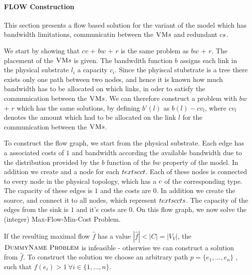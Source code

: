 




\paragraph{FLOW Construction}

This section presents a flow based solution for the variant of the model which 
has bandwidth limitations, communicatin between the $\textsc{VM} s$ and redundant 
$c s$.

We start by showing that $cv$ + $bw$ + $r$ is the same problem as $bw$ + $r$. 
The placement of the $\textsc{VM} s$ is given. The bandwdith function $b$ assigns 
each link in the physical substrate $l_i$ a capacity $c_i$. Since the phyiscal 
stubstrate is a tree there exists only one path between two nodes, and hence it 
is known how much bandwidth has to be allocated on which links, in oder to 
satisfy the communication between the $\textsc{VM} s$. We can therefore construct a 
problem with $bw$ + $r$ which has the same solutions, by defining $b'(l)$ as 
$b(l) - cv_l$, where $cv_l$ denotes the amount which had to be allocated on the 
link $l$ for the communication between the $\textsc{VM} s$.

To construct the flow graph, we start from the physical 
substrate. Each edge has a associated costs of $1$ and bandwidth according the 
available bandwidth due to the distribution provided by the $b$ function of the 
$bw$ property of the model. In addition we create and a node for each 
$textsc{ct}$. Each of these nodes is connected to every node in the physical 
topology, which has a $c$ of the corresponding type. The capacity of these 
edges is $1$ and the costs are $0$. In addition we create the source, and 
connect it to all nodes, which represent $textsc{ct} s$. The capacity of the 
edges from the sink is $1$ and it's costs are $0$.
On this flow graph, we now solve the (integer) Max-Flow-Min-Cost Problem.

If the resulting maximal flow $\hat f$ has a value $|\hat f|< |C| = |V_V|$, the 
$\textsc{DummyName Problem}$ is infeasible - otherwise we can construct a solution from $\hat f$. 
To construct the solution we choose an arbitrary path $p = \{e_1,\dots, 
e_n\}$ , such that $f(e_i) > 1 ~ \forall i \in 
\{1,\dots,n\}$.